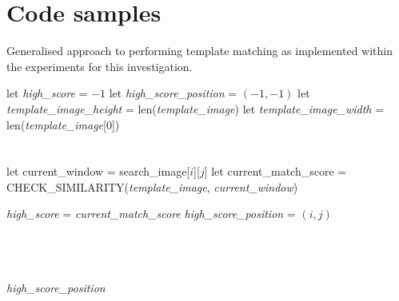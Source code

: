 \chapter{Code samples}

\begin{algorithm}
\caption{Generalised approach to performing template matching as implemented within the experiments for this investigation.}
\label{appen:code1}
\begin{algorithmic}[1]


\State let \textit{high\_score} = $-1$
\State let \textit{high\_score\_position} = $(-1, -1)$ 
\State let \textit{template\_image\_height} = len(\textit{template\_image})
\State let \textit{template\_image\_width} = len(\textit{template\_image}[0])\\\\

 \\

\State let current\_window = search\_image[$i$][$j$]
\State let current\_match\_score = CHECK\_SIMILARITY(\textit{template\_image}, \textit{current\_window}) \\


\State \textit{high\_score} = \textit{current\_match\_score}
\State \textit{high\_score\_position} = $(i, j)$

\EndIf \\

\EndFor
\EndFor \\

\\ \Return \textit{high\_score\_position} \\
\EndProcedure

\end{algorithmic}
\end{algorithm}

